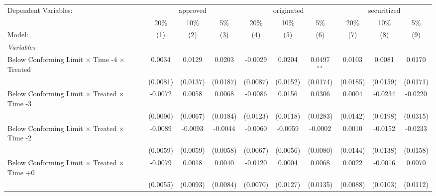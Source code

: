\begingroup
\centering
\begin{tabular}{lccccccccc}
   \tabularnewline \midrule \midrule
   Dependent Variables: & \multicolumn{3}{c}{approved} & \multicolumn{3}{c}{originated} & \multicolumn{3}{c}{securitized}\\
                                                              & 20\%           & 10\%           & 5\%            & 20\%          & 10\%           & 5\%           & 20\%         & 10\%          & 5\% \\    
   Model:                                                     & (1)            & (2)            & (3)            & (4)           & (5)            & (6)           & (7)          & (8)           & (9)\\  
   \midrule
   \emph{Variables}\\
   Below Conforming Limit $\times$ Time -4 $\times$ Treated   & 0.0034         & 0.0129         & 0.0203         & -0.0029       & 0.0204         & 0.0497$^{**}$ & 0.0103       & 0.0081        & 0.0170\\   
                                                              & (0.0081)       & (0.0137)       & (0.0187)       & (0.0087)      & (0.0152)       & (0.0174)      & (0.0185)     & (0.0159)      & (0.0171)\\   
   Below Conforming Limit $\times$ Treated $\times$ Time -3   & -0.0072        & 0.0058         & 0.0068         & -0.0086       & 0.0156         & 0.0306        & 0.0004       & -0.0234       & -0.0220\\   
                                                              & (0.0096)       & (0.0067)       & (0.0184)       & (0.0123)      & (0.0118)       & (0.0283)      & (0.0142)     & (0.0198)      & (0.0315)\\   
   Below Conforming Limit $\times$ Treated $\times$ Time -2   & -0.0089        & -0.0093        & -0.0044        & -0.0060       & -0.0059        & -0.0002       & 0.0010       & -0.0152       & -0.0233\\   
                                                              & (0.0059)       & (0.0059)       & (0.0058)       & (0.0067)      & (0.0056)       & (0.0080)      & (0.0144)     & (0.0138)      & (0.0158)\\   
   Below Conforming Limit $\times$ Treated $\times$ Time +0   & -0.0079        & 0.0018         & 0.0040         & -0.0120       & 0.0004         & 0.0068        & 0.0022       & -0.0016       & 0.0070\\   
                                                              & (0.0055)       & (0.0093)       & (0.0084)       & (0.0070)      & (0.0127)       & (0.0135)      & (0.0088)     & (0.0103)      & (0.0112)\\   

\end{tabular}
